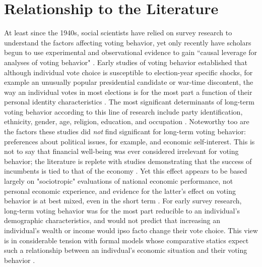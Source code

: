 \section{Relationship to the Literature}
At least since the 1940s, social scientists have relied on survey research to understand the factors affecting voting behavior, yet only recently have scholars begun to use experimental and observational evidence to gain ``causal leverage for analyses of voting behavior" \parencite{Bartels2010}. Early studies of voting behavior established that although individual vote choice is susceptible to election-year specific shocks, for example an unusually popular presidential candidate or war-time discontent, the way an individual votes in most elections is for the most part a function of their personal identity characteristics \parencite{Converse1966}. The most significant determinants of long-term voting behavior according to this line of research include party identification, ethnicity, gender, age, religion, education, and occupation \parencite{Lazarsfeld1948,Berelson1954,Campbell1960,Stanley2006a}. Noteworthy too are the factors these studies did \textit{not} find significant for long-term voting behavior: preferences about political issues, for example, and economic self-interest. This is not to say that financial well-being was ever considered irrelevant for voting behavior; the literature is replete with studies demonstrating that the success of incumbents is tied to that of the economy \parencite{Tufte1975,Meltzer1975,Hibbs1987}. Yet this effect appears to be based largely on "sociotropic" evaluations of national economic performance, not personal economic experience, and evidence for the latter's effect on voting behavior is at best mixed, even in the short term \parencite{Linn2010}.  For early survey research, long-term voting behavior was for the most part reducible to an individual's demographic characteristics, and would not predict that increasing an individual's wealth or income would ipso facto change their vote choice.  This view is in considerable tension with formal models whose comparative statics expect such a relationship between an indivdual's economic situation and their voting behavior \parencite[e.g.,][]{Romer1975,Roberts1977,Meltzer1981}.

